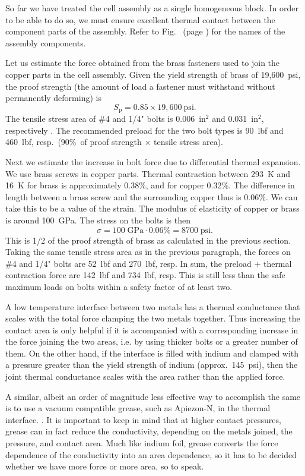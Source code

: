 So far we have treated the cell assembly as a single homogeneous block. In order
to be able to do so, we must ensure excellent thermal contact between the
component parts of the assembly. Refer to Fig.~ (page
\pageref{cell_assembly}) for the names of the assembly components.

Let us estimate the force obtained from the brass fasteners used to join the
copper parts in the cell assembly. Given the yield strength of brass of
19,600~psi, the proof strength (the amount of load a fastener must withstand
without permanently deforming) \cite[p.~1428]{oberg2008machinery} is
%
\[
   S_\text{p}=0.85\times19,600~\text{psi}.
\]
%
The tensile stress area of \#4 and 1/4" bolts is 0.006~in$^2$ and 0.031~in$^2$,
respectively \cite[p.~1750]{oberg2008machinery}. The recommended preload for the
two bolt types is 90~lbf and 460~lbf, resp.\ (90\%\ of proof strength $\times$
tensile stress area).

Next we estimate the increase in bolt force due to differential thermal
expansion. We use brass screws in copper parts. Thermal contraction between
293~K and 16~K for brass is approximately 0.38\%, and for copper 0.32\%. The
difference in length between a brass screw and the surrounding copper thus is
0.06\%. We can take this to be a value of the strain. The modulus of elasticity of
copper or brass is around 100~GPa. The stress on the bolts is then
%
\[
   \sigma=100\;\text{GPa}\cdot0.06\%=8700\;\text{psi}.
\]
%
This is 1/2 of the proof strength of brass as calculated in the previous
section. Taking the same tensile stress area as in the previous paragraph, the
forces on \#4 and 1/4" bolts are 52~lbf and 270~lbf, resp. In sum, the preload +
thermal contraction force are 142~lbf and 734~lbf, resp. This is still less than
the safe maximum loads on bolts within a safety factor of at least two.

A low temperature interface between two metals has a thermal conductance that
scales with the total force clamping the two metals together. Thus increasing
the contact area is only helpful if it is accompanied with a corresponding
increase in the force joining the two areas, i.e. by using thicker bolts or a
greater number of them. On the other hand, if the interface is filled with
indium and clamped with a pressure greater than the yield strength of indium
(approx.\ 145~psi), then the joint thermal conductance scales with the area
rather than the applied force. \cite[sec~2.6.3]{ekin2006experimental}

A similar, albeit an order of magnitude less effective way to accomplish the
same is to use a vacuum compatible grease, such as Apiezon-N, in the thermal
interface. \cite[Fig.~10]{dillon2017thermal}. It is important to keep in mind
that at higher contact pressures, grease can in fact reduce the conductivity,
depending on the metals joined, the pressure, and contact area. Much like indium
foil, grease converts the force dependence of the conductivity into an area
dependence, so it has to be decided whether we have more force or more area, so
to speak.

